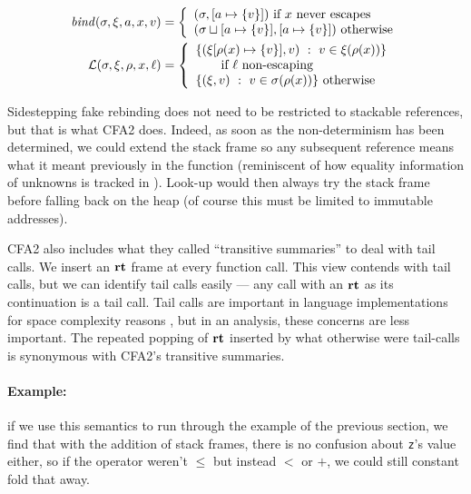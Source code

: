 \begin{align*}
  \mathit{bind}(\sigma,\xi,a,x,v) &=
   \left\{\begin{array}{l}
            (\sigma, [a \mapsto \{ v \}]) \text{ if } x \text{ never escapes} \\
            (\sigma\sqcup[a \mapsto \{ v \}], [a \mapsto \{ v \}]) \text{ otherwise} \\
          \end{array}\right. \\
  {\mathcal L}(\sigma,\xi,\rho,x,\ell) &=
    \left\{\begin{array}{l}
          \{ (\xi[\rho(x) \mapsto \{ v \}], v)\ :\ v \in \xi(\rho(x))\}
                   \\ \qquad \text{if } \ell \text{ non-escaping} \\
          \{ (\xi,v)\ :\ v \in \sigma(\rho(x))\} \text{ otherwise}
           \end{array}\right.
\end{align*}

Sidestepping fake rebinding does not need to be restricted to stackable references, but that is what CFA2 does.
%
Indeed, as soon as the non-determinism has been determined, we could extend the stack frame so any subsequent reference means what it meant previously in the function (reminiscent of how equality information of unknowns is tracked in \citet{ianjohnson:DBLP:journals/cacm/DilligDA10}).
%
Look-up would then always try the stack frame before falling back on the heap (of course this must be limited to immutable addresses).

CFA2 also includes what they called ``transitive summaries'' to deal with tail calls.
%
We insert an $\mathbf{rt}$ frame at every function call.
%
This view contends with tail calls, but we can identify tail calls easily --- any call with an $\mathbf{rt}$ as its continuation is a tail call.
%
Tail calls are important in language implementations for space complexity reasons \citep{ianjohnson:clinger:tail-calls:1998}, but in an analysis, these concerns are less important.
%
The repeated popping of $\mathbf{rt}$ inserted by what otherwise were tail-calls is synonymous with CFA2's transitive summaries.

\paragraph{Example:} if we use this semantics to run through the example of the previous section, we find that with the addition of stack frames, there is no confusion about \texttt{z}'s value either, so if the operator weren't $\le$ but instead $<$ or $+$, we could still constant fold that away.

